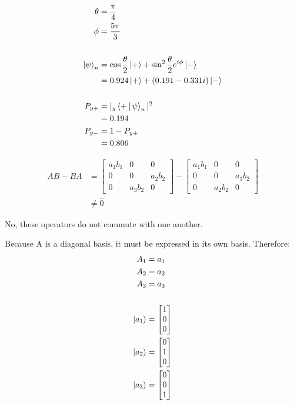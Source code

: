 \documentclass[12pt]{article}
\begin{document}
\newpage
\problem
\begin{align*}
    \theta &= \frac{\pi}{4} \\
    \phi &= \frac{5\pi}{3} \\ \\
    \Ket{\psi}_n &= \cos{\frac{\theta}{2}}\Ket{+} + \sin^2{\frac{\theta}{2}}e^{i\phi}\Ket{-} \\
                 &= 0.924\Ket{+} + (0.191 - 0.331i)\Ket{-} \\ \\
    P_{y+} &= |{}_y\Braket{+|\psi}_n|^2 \\
           &= 0.194 \\
    P_{y-} &= 1 - P_{y+} \\
           &= 0.806
\end{align*}


\problemasub
\begin{align*}
    AB - BA &= \begin{bmatrix}
    a_1 b_1 & 0 & 0 \\
    0 & 0 & a_2 b_2 \\
    0 & a_3 b_2 & 0
    \end{bmatrix} -
    \begin{bmatrix}
        a_1 b_1 & 0 & 0 \\
        0 & 0 & a_3 b_2 \\
        0 & a_2 b_2 & 0
    \end{bmatrix} \\
    &\ne \hat{0}
\end{align*}

No, these operators do not commute with one another.

\newpage
\problemasub
Because A is a diagonal basis, it must be expressed in its own basis. Therefore:
\begin{align*}
    A_1 &= a_1 \\
    A_2 &= a_2 \\
    A_3 &= a_3 \\
    \\
    \Ket{a_1} &= \begin{bmatrix}1\\0\\0\end{bmatrix} \\
    \Ket{a_2} &= \begin{bmatrix}0\\1\\0\end{bmatrix} \\
    \Ket{a_3} &= \begin{bmatrix}0\\0\\1\end{bmatrix}
\end{align*}
\end{document}
